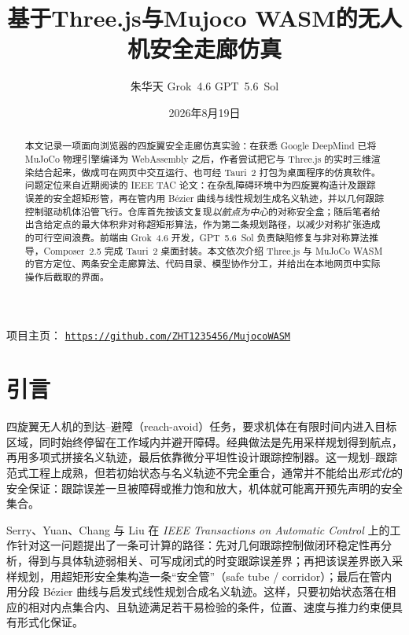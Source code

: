 \documentclass[UTF8,a4paper,11pt,zihao=-4]{ctexart}
\title{基于Three.js与Mujoco WASM的无人机安全走廊仿真}
\author{
  朱华天 \quad Grok~4.6 \quad GPT~5.6~Sol
}
\date{2026年8月19日}
\begin{document}
\maketitle

\begin{center}
\small
项目主页：
\href{https://github.com/ZHT1235456/MujocoWASM}{\texttt{https://github.com/ZHT1235456/MujocoWASM}}
\end{center}

\vspace{0.4em}
\begin{abstract}
\noindent
本文记录一项面向浏览器的四旋翼安全走廊仿真实验：在获悉 Google DeepMind 已将 MuJoCo 物理引擎编译为 WebAssembly 之后，作者尝试把它与 Three.js 的实时三维渲染结合起来，做成可在网页中交互运行、也可经 Tauri~2 打包为桌面程序的仿真软件。问题定位来自近期阅读的 IEEE TAC 论文\cite{serry2026reachavoid}：在杂乱障碍环境中为四旋翼构造计及跟踪误差的安全超矩形管，再在管内用 B\'ezier 曲线与线性规划生成名义轨迹，并以几何跟踪控制驱动机体沿管飞行。仓库首先按该文复现\emph{以航点为中心}的对称安全盒；随后笔者给出含给定点的最大体积非对称超矩形算法\cite{zhu2026asymmetric}，作为第二条规划路径，以减少对称扩张造成的可行空间浪费。前端由 Grok~4.6 开发，GPT~5.6~Sol 负责缺陷修复与非对称算法推导，Composer~2.5 完成 Tauri~2 桌面封装。本文依次介绍 Three.js 与 MuJoCo WASM 的官方定位、两条安全走廊算法、代码目录、模型协作分工，并给出在本地网页中实际操作后截取的界面。
\end{abstract}

\section{引言}

四旋翼无人机的到达--避障（reach-avoid）任务，要求机体在有限时间内进入目标区域，同时始终停留在工作域内并避开障碍。经典做法是先用采样规划得到航点，再用多项式拼接名义轨迹，最后依靠微分平坦性设计跟踪控制器。这一规划--跟踪范式工程上成熟，但若初始状态与名义轨迹不完全重合，通常并不能给出\emph{形式化}的安全保证：跟踪误差一旦被障碍或推力饱和放大，机体就可能离开预先声明的安全集合。

Serry、Yuan、Chang 与 Liu 在 \emph{IEEE Transactions on Automatic Control} 上的工作\cite{serry2026reachavoid}针对这一问题提出了一条可计算的路径：先对几何跟踪控制做闭环稳定性再分析，得到与具体轨迹弱相关、可写成闭式的时变跟踪误差界；再把该误差界嵌入采样规划，用超矩形安全集构造一条``安全管''（safe tube / corridor）；最后在管内用分段 B\'ezier 曲线与启发式线性规划合成名义轨迹。这样，只要初始状态落在相应的相对内点集合内、且轨迹满足若干易检验的条件，位置、速度与推力约束便具有形式化保证。
\end{document}
